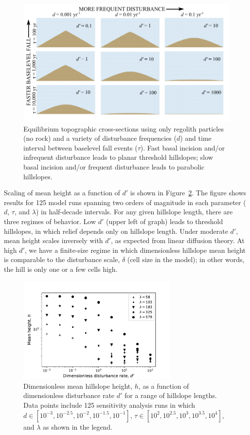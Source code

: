 \documentclass[esurf, manuscript]{copernicus}
\begin{document}
\begin{figure}[t]
\includegraphics{Figures/simple_hills_3x3.pdf}
\caption{Equilibrium topographic cross-sections using only regolith particles (no rock) and a variety of disturbance frequencies ($d$) and time interval between baselevel fall events ($\tau$). Fast basal incision and/or infrequent disturbance leads to planar threshold hillslopes; slow basal incision and/or frequent disturbance leads to parabolic hillslopes.}
\label{tlim}
\end{figure}

Scaling of mean height as a function of $d'$ is shown in Figure~\ref{tlimscaling}. The figure shows results for 125 model runs spanning two orders of magnitude in each parameter ($d$, $\tau$, and $\lambda$) in half-decade intervals. For any given hillslope length, there are three regimes of behavior. Low $d'$ (upper left of graph) leads to threshold hillslopes, in which relief depends only on hillslope length. Under moderate $d'$, mean height scales inversely with $d'$, as expected from linear diffusion theory. At high $d'$, we have a finite-size regime in which dimensionless hillslope mean height is comparable to the disturbance scale, $\delta$ (cell size in the model); in other words, the hill is only one or a few cells high.

\begin{figure}[t]
\includegraphics[width=8cm]{Figures/mean_ht_vs_dist_rate.pdf}
\caption{Dimensionless mean hillslope height, $h$, as a function of dimensionless disturbance rate $d'$ for a range of hillslope lengths. Data points include 125 sensitivity analysis runs in which $d\in [10^{-3},10^{-2.5},10^{-2},10^{-1.5},10^{-1}]$, $\tau\in [10^2, 10^{2.5}, 10^3, 10^{3.5}, 10^4]$, and $\lambda$ as shown in the legend.}
\label{tlimscaling}
\end{figure}
\end{document}
